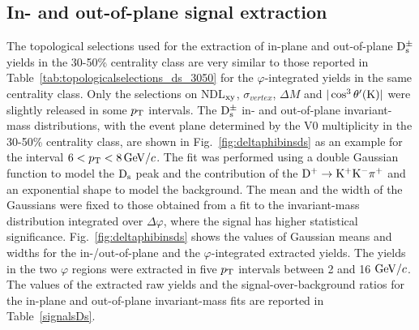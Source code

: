 \subsection{In- and out-of-plane signal extraction}
 \label{sec:SigExtracV2}
 The topological selections used for the extraction of
 in-plane and out-of-plane ${\rm D_s^{\pm}}$ yields in the 30-50\% centrality class
 are very similar to those reported in Table~\ref{tab:topologicalselections_ds_3050} for the
 $\varphi$-integrated yields in the same centrality class.
 Only the selections on NDL$_{\rm xy}$, $\sigma_{vertex}$, $\Delta M$ 
 and $|\cos^3 \theta^\prime({\rm K})|$ were slightly released in some $p_{\rm T}$
 intervals. The ${\rm D_s^{\pm}}$ in- and out-of-plane invariant-mass distributions, 
with the event plane determined by the V0 multiplicity 
in the 30-50\% centrality class, are shown in Fig.~\ref{fig:deltaphibinsds} 
as an example for the interval $6 < p_{\rm T} < 8 \, \mathrm{GeV}/c$.
The fit was performed using a double Gaussian function to model 
the ${\rm D_s}$ peak and the contribution of the ${\rm D^{+}\to K^+ K^-\pi^+}$ and 
an exponential shape to model the background.
The mean and the width of the Gaussians were fixed to those obtained from a fit to
the invariant-mass distribution integrated over $\Delta \varphi$, 
where the signal has higher statistical significance. 
Fig.~\ref{fig:deltaphibinsds} shows the values of Gaussian means and 
widths for the in-/out-of-plane and the $\varphi$-integrated extracted yields.
The yields in the two $\varphi$ regions were extracted in five $p_{\rm T}$ 
intervals between 2 and 16 $\mathrm{GeV}/c$.
The values of the extracted raw yields and the signal-over-background 
ratios for the in-plane and out-of-plane invariant-mass fits 
are reported in Table~\ref{signalsDs}.

